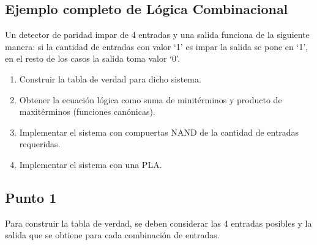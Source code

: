 \subsection{Ejemplo completo de Lógica Combinacional}
Un detector de paridad impar de 4 entradas y una salida funciona de la siguiente manera: si la cantidad de entradas con valor ‘1’ es impar la salida se pone en ‘1’, en el resto de los casos la salida toma valor ‘0’.
\begin{enumerate}%
    \item Construir la tabla de verdad para dicho sistema.
    \item Obtener la ecuación lógica como suma de minitérminos y producto de maxitérminos (funciones canónicas).
    \item Implementar el sistema con compuertas NAND de la cantidad de entradas requeridas.
    \item Implementar el sistema con una PLA.
\end{enumerate}

\subsection*{Punto 1}
Para construir la tabla de verdad, se deben considerar las 4 entradas posibles y la salida que se obtiene para cada combinación de entradas.

